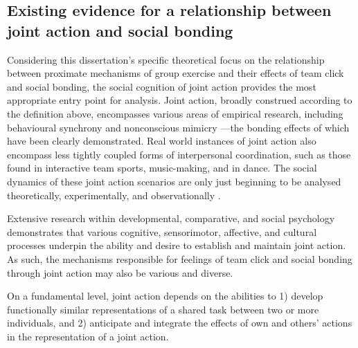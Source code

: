 \begin{CJK}{UTF8}{gbsn}
{






\clearpage
\section{Existing evidence for a relationship between joint action and social bonding} %


Considering this dissertation's specific theoretical focus on the relationship between proximate mechanisms of group exercise and their effects of team click and social bonding, the social cognition of joint action provides the most appropriate entry point for analysis.  Joint action, broadly construed according to the definition above, encompasses various areas of empirical research, including behavioural synchrony \citep{Reddish2013,Launay2016,Mogan2017} and nonconscious mimicry \citep{Bargh2012}---the bonding effects of which have been clearly demonstrated.  Real world instances of joint action also encompass less tightly coupled forms of interpersonal coordination, such as those found in interactive team sports, music-making, and in dance.  The social dynamics of these joint action scenarios are only just beginning to be analysed theoretically, experimentally, and observationally \citep{Marsh2009}.

Extensive research within developmental, comparative, and social psychology demonstrates that various cognitive, sensorimotor, affective, and cultural processes underpin the ability and desire to establish and maintain joint action.  As such, the mechanisms responsible for feelings of team click and social bonding through joint action may also be various and diverse.

On a fundamental level, joint action depends on the abilities to 1) develop functionally similar representations of a shared task between two or more individuals, and 2) anticipate and integrate the effects of own and others' actions in the representation of a joint action\citep{Sebanz2006a}.

}
\end{CJK}
